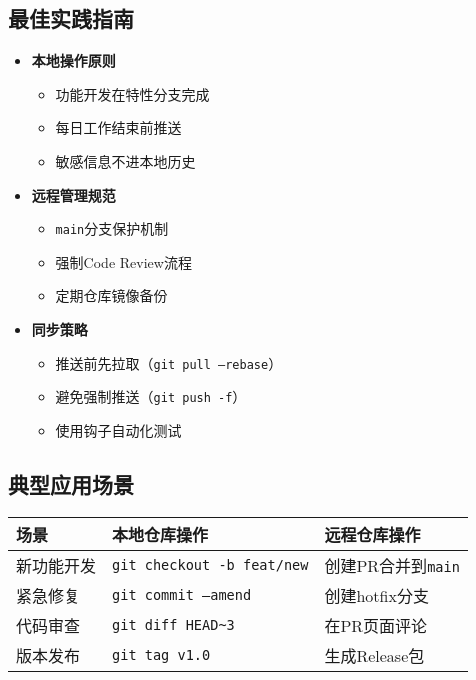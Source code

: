 \subsection{最佳实践指南}
\begin{itemize}[leftmargin=*, nosep]
    \item \textbf{本地操作原则}
    \begin{itemize}[leftmargin=*, nosep]
        \item 功能开发在特性分支完成
        \item 每日工作结束前推送
        \item 敏感信息不进本地历史
    \end{itemize}
    
    \item \textbf{远程管理规范}
    
\begin{itemize}[leftmargin=*, nosep]
        \item \texttt{main}分支保护机制
        \item 强制Code Review流程
        \item 定期仓库镜像备份
    \end{itemize}
    
    \item \textbf{同步策略}
    
\begin{itemize}[leftmargin=*, nosep]
        \item 推送前先拉取（\texttt{git pull --rebase}）
        \item 避免强制推送（\texttt{git push -f}）
        \item 使用钩子自动化测试
    \end{itemize}
\end{itemize}

\subsection{典型应用场景}
\begin{center}
\begin{tabular}{lp{6cm}p{6cm}}
    \toprule
    \textbf{场景} & \textbf{本地仓库操作} & \textbf{远程仓库操作} \\
    \midrule
    新功能开发 & \texttt{git checkout -b feat/new} & 创建PR合并到\texttt{main} \\
    紧急修复 & \texttt{git commit --amend} & 创建hotfix分支 \\
    代码审查 & \texttt{git diff HEAD\~{}3} & 在PR页面评论 \\
    版本发布 & \texttt{git tag v1.0} & 生成Release包 \\
    \bottomrule
\end{tabular}
\end{center}

